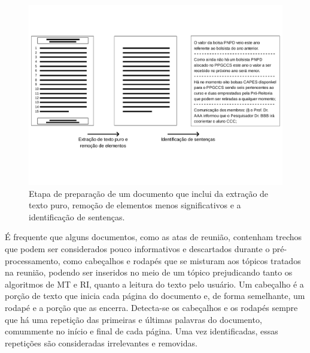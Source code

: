 \begin{center}
	\begin{figure}[h!]

		\includegraphics[trim={ 0 100 0 100 },clip,page=1,width=\textwidth]{conteudo/capitulos/figs/preparacao-docs.pdf}

		\caption{Etapa de preparação de um documento que inclui da extração de texto puro,  remoção de elementos menos significativos e a identificação de sentenças.}
		\label{fig:preprocessamento-segmentacao}
	\end{figure}
\end{center}




É frequente que alguns documentos, como as atas de reunião, contenham trechos que podem ser considerados pouco informativos e descartados durante o pré-processamento, como cabeçalhos e rodapés que se misturam aos tópicos tratados na reunião, podendo ser inseridos no meio de um tópico prejudicando tanto os algoritmos de MT e RI, quanto a leitura do texto pelo usuário. Um cabeçalho é a porção de texto que inicia cada página do documento e, de forma semelhante, um rodapé e a porção que as encerra. Detecta-se os cabeçalhos e os rodapés sempre que há uma repetição das primeiras e últimas palavras do documento, comummente no início e final de cada página. Uma vez identificadas, essas repetições são consideradas irrelevantes e removidas.


